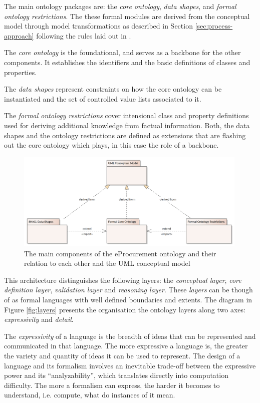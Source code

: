 	The main ontology packages are: the \textit{core ontology}, \textit{data shapes}, and \textit{formal ontology restrictions}. The these formal modules are derived from the conceptual model through model transformations as described in Section \ref{sec:process-approach} following the rules laid out in \citet{costetchi2020c}.
	
	The \textit{core ontology} is the foundational, and serves as a backbone for the other components. It establishes the identifiers and the basic definitions of classes and properties.
	 	
	The \textit{data shapes} represent constraints on how the core ontology can be instantiated and the set of controlled value lists associated to it. 	
	
	The \textit{formal ontology restrictions} cover intensional class and property definitions used for deriving additional knowledge from factual information. Both, the data shapes and the ontology restrictions are defined as extensions that are flashing out the core ontology which plays, in this case the role of a backbone.
	
	\begin{figure}[!ht]
		\centering
		\includegraphics[width=0.99\textwidth]{../img/uml.png}
		\caption{The main components of the eProcurement ontology and their relation to each other and the UML conceptual model}
		\label{fig:components}
	\end{figure}
	
	This architecture distinguishes the following layers: the \textit{conceptual layer}, \textit{core definition layer}, \textit{validation layer} and \textit{reasoning layer}. These \textit{layers} can be though of as formal languages with well defined boundaries and extents. The diagram in Figure \ref{fig:layers} presents the organisation the ontology layers along two axes: \textit{expressivity} and \textit{detail}. 
	
	The \textit{expressivity} of a language is the breadth of ideas that can be represented and communicated in that language. The more expressive a language is, the greater the variety and quantity of ideas it can be used to represent. The design of a language and its formalism involves an inevitable trade-off between the expressive power and its ``analyzability'', which translates directly into computation difficulty. The more a formalism can express, the harder it becomes to understand, i.e. compute, what do instances of it mean.
	
